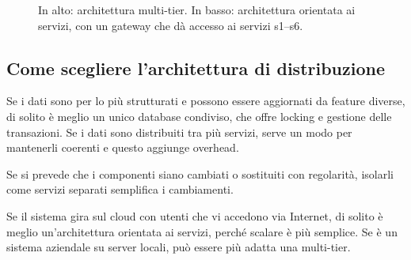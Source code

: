 \begin{figure}[ht]
\centering
{}
\caption{In alto: architettura multi-tier. In basso: architettura orientata ai servizi, con un gateway che dà accesso
ai servizi s1--s6.}
\label{fig:arch-tier}
\end{figure}

\subsection{Come scegliere l'architettura di distribuzione}

\begin{description}[leftmargin=0pt, style=unboxed]
  \item[Data type and data updates.] Se i dati sono per lo più strutturati e possono essere aggiornati da feature
    diverse, di solito è meglio un unico database condiviso, che offre locking e gestione delle transazioni. Se i dati
    sono distribuiti tra più servizi, serve un modo per mantenerli coerenti e questo aggiunge overhead.
  \item[Change frequency.] Se si prevede che i componenti siano cambiati o sostituiti con regolarità, isolarli come
    servizi separati semplifica i cambiamenti.
  \item[The system execution platform.] Se il sistema gira sul cloud con utenti che vi accedono via Internet, di solito è
    meglio un'architettura orientata ai servizi, perché scalare è più semplice. Se è un sistema aziendale su server
    locali, può essere più adatta una multi-tier.
\end{description}

